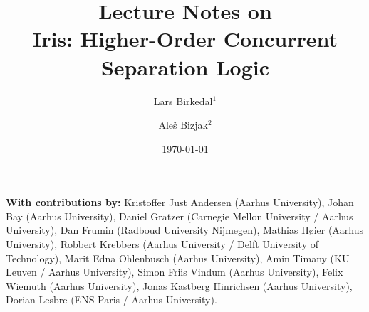 \documentclass{article}
\title{\vfill Lecture Notes on\\ Iris: Higher-Order Concurrent Separation Logic}
\author{Lars Birkedal$^1$}
\author{Ale\v{s} Bizjak$^2$}
\affil{
  $^1$ \href{mailto:birkedal@cs.au.dk}{birkedal@cs.au.dk}\\
  $^2$ \href{ales@alesb.com}{ales@alesb.com}\\
  \vspace{2.5mm}
  Aarhus University}
\date{\today\vfill}
\begin{document}
\maketitle
\thispagestyle{empty}

\begin{minipage}{\textwidth-2cm}
  \textbf{With contributions by:}
  Kristoffer Just Andersen (Aarhus University),
  Johan Bay (Aarhus University),
  Daniel Gratzer (Carnegie Mellon University / Aarhus University),
  Dan Frumin (Radboud University Nijmegen),
  Mathias H{\o}ier (Aarhus University),
  Robbert Krebbers (Aarhus University / Delft University of Technology),
  Marit Edna Ohlenbusch (Aarhus University),
  Amin Timany (KU Leuven / Aarhus University),
  Simon Friis Vindum (Aarhus University),
  Felix Wiemuth (Aarhus University),
  Jonas Kastberg Hinrichsen (Aarhus University),
  Dorian Lesbre (ENS Paris / Aarhus University).
\end{minipage}

\newpage

\pagestyle{empty}
\setcounter{tocdepth}{2}
\tableofcontents

\newpage

\pagestyle{plain}
\setcounter{page}{1}


\newpage








































\appendix


\end{document}

